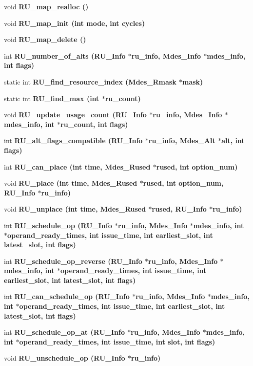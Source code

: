 \begin{CompactItemize}
void \bf{RU\_\-map\_\-realloc} ()
\item 
void \bf{RU\_\-map\_\-init} (int \bf{mode}, int cycles)
\item 
void \bf{RU\_\-map\_\-delete} ()
\item 
int \bf{RU\_\-number\_\-of\_\-alts} (\bf{RU\_\-Info} $\ast$ru\_\-info, Mdes\_\-Info $\ast$mdes\_\-info, int flags)
\item 
static int \bf{RU\_\-find\_\-resource\_\-index} (Mdes\_\-Rmask $\ast$mask)
\item 
static int \bf{RU\_\-find\_\-max} (int $\ast$ru\_\-count)
\item 
void \bf{RU\_\-update\_\-usage\_\-count} (\bf{RU\_\-Info} $\ast$ru\_\-info, Mdes\_\-Info $\ast$mdes\_\-info, int $\ast$ru\_\-count, int flags)
\item 
int \bf{RU\_\-alt\_\-flags\_\-compatible} (\bf{RU\_\-Info} $\ast$ru\_\-info, Mdes\_\-Alt $\ast$alt, int flags)
\item 
int \bf{RU\_\-can\_\-place} (int time, Mdes\_\-Rused $\ast$rused, int option\_\-num)
\item 
void \bf{RU\_\-place} (int time, Mdes\_\-Rused $\ast$rused, int option\_\-num, \bf{RU\_\-Info} $\ast$ru\_\-info)
\item 
void \bf{RU\_\-unplace} (int time, Mdes\_\-Rused $\ast$rused, \bf{RU\_\-Info} $\ast$ru\_\-info)
\item 
int \bf{RU\_\-schedule\_\-op} (\bf{RU\_\-Info} $\ast$ru\_\-info, Mdes\_\-Info $\ast$mdes\_\-info, int $\ast$operand\_\-ready\_\-times, int issue\_\-time, int earliest\_\-slot, int latest\_\-slot, int flags)
\item 
int \bf{RU\_\-schedule\_\-op\_\-reverse} (\bf{RU\_\-Info} $\ast$ru\_\-info, Mdes\_\-Info $\ast$mdes\_\-info, int $\ast$operand\_\-ready\_\-times, int issue\_\-time, int earliest\_\-slot, int latest\_\-slot, int flags)
\item 
int \bf{RU\_\-can\_\-schedule\_\-op} (\bf{RU\_\-Info} $\ast$ru\_\-info, Mdes\_\-Info $\ast$mdes\_\-info, int $\ast$operand\_\-ready\_\-times, int issue\_\-time, int earliest\_\-slot, int latest\_\-slot, int flags)
\item 
int \bf{RU\_\-schedule\_\-op\_\-at} (\bf{RU\_\-Info} $\ast$ru\_\-info, Mdes\_\-Info $\ast$mdes\_\-info, int $\ast$operand\_\-ready\_\-times, int issue\_\-time, int slot, int flags)
\item 
void \bf{RU\_\-unschedule\_\-op} (\bf{RU\_\-Info} $\ast$ru\_\-info)
\end{CompactItemize}
